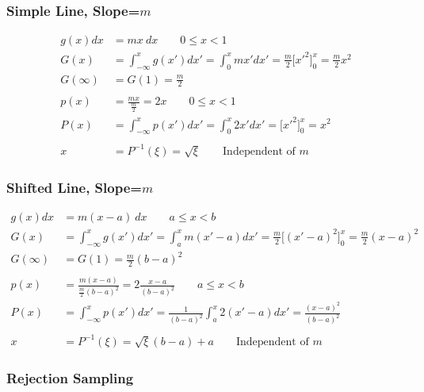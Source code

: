 \documentclass[12pt]{article}
\begin{document}
\subsubsection*{Simple Line, Slope=$m$}

\begin{align*}
  g(x) dx &= mx\:dx \qquad 0 \leq x < 1\\
  G(x) &= \int_{-\infty}^x g(x')dx' = \int_0^x mx' dx' = \frac{m}{2}\bigl[x'^2 \bigr]_0^x = \frac{m}{2} x^2\\
  G(\infty) &= G(1) = \frac{m}{2}\\
  & \\
  p(x) &= \frac{mx}{\frac{m}{2}} = 2x \qquad 0 \leq x < 1\\
  P(x) &= \int_{-\infty}^x p(x')dx' = \int_0^x 2x' dx' = \bigl[x'^2 \bigr]_0^x = x^2\\
  &\\
  x &= P^{-1}(\xi) = \sqrt{\xi} \qquad\text{Independent of }m
\end{align*}   

\subsubsection*{Shifted Line, Slope=$m$}

\begin{align*}
  g(x) dx &= m(x - a)\:dx \qquad a \leq x < b\\
  G(x) &= \int_{-\infty}^x g(x')dx' = \int_a^x m(x'-a) dx' = \frac{m}{2}\bigl[(x'-a)^2 \bigr]_0^x = \frac{m}{2} (x-a)^2\\
  G(\infty) &= G(1) = \frac{m}{2}(b-a)^2\\
  &\\
  p(x) &= \frac{m(x-a)}{\frac{m}{2}(b-a)^2} = 2 \frac{x-a}{(b-a)^2}\qquad a \leq x < b\\
  P(x) &= \int_{-\infty}^x p(x')dx' = \frac{1}{(b-a)^2}\int_a^x 2(x'-a) dx' = \frac{(x-a)^2}{(b-a)^2}\\
  &\\
  x &= P^{-1}(\xi) = \sqrt{\xi}(b-a) + a \qquad\text{Independent of }m
\end{align*}

\subsubsection*{Rejection Sampling}
\end{document}
